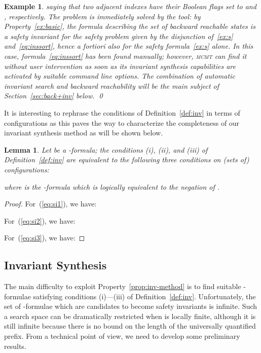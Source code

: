 \documentclass{LMCS}
\theoremstyle{plain}\newtheorem{assumption}[thm]{Assumption}
\theoremstyle{plain}\newtheorem{proposition}[thm]{Proposition}
\theoremstyle{plain}\newtheorem{property}[thm]{Property}
\theoremstyle{plain}\newtheorem{example}[thm]{Example}
\theoremstyle{plain}\newtheorem{claim}[thm]{Claim}
\theoremstyle{plain}\newtheorem{lemma}[thm]{Lemma}
\begin{document}
\begin{example}
  saying that two adjacent indexes have their Boolean flags set to
   and , respectively. The problem is immediately solved
  by the tool: by Property~\ref{ex:basic}, the formula describing the
  set of backward reachable states is a safety invariant for the safety
  problem given by the disjunction of~\eqref{ex:s}
  and~\eqref{eq:inssort}, hence \emph{a fortiori} also for the safety
  formula~\eqref{ex:s} alone.  In this case,
  formula~\eqref{eq:inssort} has been found manually; however,
  \textsc{mcmt} \emph{can find it without user intervention} as soon
  as its invariant synthesis capabilities are activated by suitable
  command line options.  The combination of automatic invariant search
  and backward reachability will be the main subject of
  Section~\ref{sec:back+inv} below. \qed
\end{example}
It is interesting to rephrase the conditions of
Definition~\ref{def:inv} in terms of configurations as this paves the
way to characterize the completeness of our invariant synthesis method
as will be shown below.
\begin{lemma}
  \label{lem:inv}
  Let  be a -formula; the conditions (i), (ii), and
  (iii) of Definition~\ref{def:inv} are equivalent to the following
  three conditions on (sets of) configurations:
  
  where  is the -formula which is logically equivalent
  to the negation of .
\end{lemma}
\begin{proof}
  For~(\ref{eq:si1}), we have:
  
  For~(\ref{eq:si2}), we have:
  
  For~(\ref{eq:si3}), we have:
  
\end{proof}


\subsection{Invariant Synthesis}
\label{subsec:dual}
The main difficulty to exploit Property~\ref{prop:inv-method} is to
find suitable -formulae satisfying conditions (i)---(iii)
of Definition~\ref{def:inv}.  Unfortunately, the set of
-formulae which are candidates to become safety invariants
is infinite.  Such a search space can be dramatically restricted when
 is locally finite, although it is still infinite because there
is no bound on the length of the universally quantified prefix.  From
a technical point of view, we need to develop some preliminary results.
\end{document}
